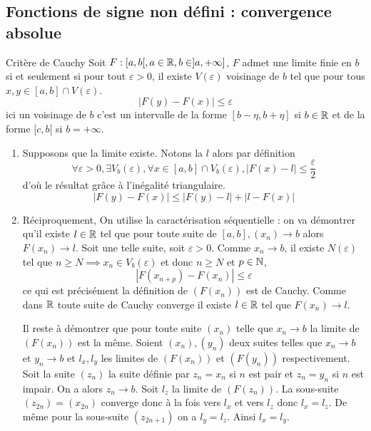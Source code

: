 \documentclass[a4paper, 12pt]{article}
\renewcommand*{\today}{21 November 2025}
\begin{document}
\hotbox{Analyse 3}{CM 15}{\today}

\subsection{Fonctions de signe non défini : convergence absolue}

\begin{lemme}{Critère de Cauchy}{}
    Soit $F: [a, b[, a \in \mathbb{R}, b \in ]a, +\infty]$, $F$ admet une limite finie en $b$ si et seulement si
    pour tout $\varepsilon > 0$, il existe $V(\varepsilon)$ voisinage de $b$ tel que pour tous $x, y \in [a, b] \cap V(\varepsilon)$.
    $$
    |F(y) - F(x)| \leq \varepsilon
    $$
    ici un voisinage de $b$ c'est un intervalle de la forme $[b - \eta, b + \eta]$ si $b \in \mathbb{R}$
    et de la forme $[c, b[$ si $b = +\infty$.
\end{lemme}

\begin{demonstration}
    \begin{enumerate}
        \item Supposons que la limite existe. Notons la $l$ alors par définition
        $$
        \forall \varepsilon > 0, \exists V_b(\varepsilon), \forall x \in [a, b] \cap V_b(\varepsilon), |F(x) - l| \leq \frac{\varepsilon}{2}
        $$
        d'où le résultat grâce à l'inégalité triangulaire.
        $$
        |F(y) - F(x)| \leq |F(y) - l| + |l - F(x)|
        $$
        \item Réciproquement, On utilise la caractérisation séquentielle : on va démontrer qu'il existe $l \in \mathbb{R}$
        tel que pour toute suite de $[a, b], (x_n) \to b$ alors $F(x_n) \to l$.
        Soit une telle suite, soit $\varepsilon > 0$. Comme $x_n \to b$, il existe $N(\varepsilon)$ tel que $n \geq N \implies x_n \in V_b(\varepsilon)$
        et donc $n \geq N$ et $p \in \mathbb{N}$,
        $$
        |F(x_{n+p}) - F(x_n)| \leq \varepsilon
        $$
        ce qui est précisément la définition de $(F(x_n))$ est de Cauchy. Comme dans $\mathbb{R}$ toute suite de Cauchy
        converge il existe $l \in \mathbb{R}$ tel que $F(x_n) \to l$.

        Il reste à démontrer que pour toute suite $(x_n)$ telle que $x_n \to b$ la limite de $(F(x_n))$ est la même.
        Soient $(x_n), (y_n)$ deux suites telles que $x_n \to b$ et $y_n \to b$ et $l_x, l_y$ les limites de $(F(x_n))$ et $(F(y_n))$ respectivement.
        Soit la suite $(z_n)$ la suite définie par $z_n = x_n$ si $n$ est pair et $z_n = y_n$ si $n$ est impair.
        On a alors $z_n \to b$. Soit $l_z$ la limite de $(F(z_n))$. La sous-suite $(z_{2n}) = (x_{2n})$ converge donc à la fois
        vers $l_x$ et vers $l_z$ donc $l_x = l_z$. De même pour la sous-suite $(z_{2n+1})$ on a $l_y = l_z$. Ainsi $l_x = l_y$.
    \end{enumerate}
\end{demonstration}
\end{document}
